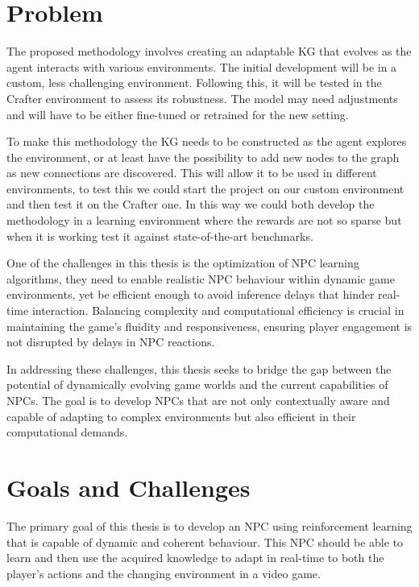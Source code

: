 \documentclass{article}
\begin{document}
\section{Problem} 

The proposed methodology involves creating an adaptable KG that evolves as the agent interacts with various environments. The initial development will be in a custom, less challenging environment. Following this, it will be tested in the Crafter environment to assess its robustness. The model may need adjustments and will have to be either fine-tuned or retrained for the new setting.

To make this methodology the KG needs to be constructed as the agent explores the environment, or at least have the possibility to add new nodes to the graph as new connections are discovered. This will allow it to be used in different environments, to test this we could start the project on our custom environment and then test it on the Crafter one. In this way we could both develop the methodology in a learning environment where the rewards are not so sparse but when it is working test it against state-of-the-art benchmarks.

One of the challenges in this thesis is the optimization of NPC learning algorithms, they need to enable realistic NPC behaviour within dynamic game environments, yet be efficient enough to avoid inference delays that hinder real-time interaction. Balancing complexity and computational efficiency is crucial in maintaining the game's fluidity and responsiveness, ensuring player engagement is not disrupted by delays in NPC reactions.

In addressing these challenges, this thesis seeks to bridge the gap between the potential of dynamically evolving game worlds and the current capabilities of NPCs. The goal is to develop NPCs that are not only contextually aware and capable of adapting to complex environments but also efficient in their computational demands.

\section{Goals and Challenges}

The primary goal of this thesis is to develop an NPC using reinforcement learning that is capable of dynamic and coherent behaviour. This NPC should be able to learn and then use the acquired knowledge to adapt in real-time to both the player's actions and the changing environment in a video game. 
\end{document}
